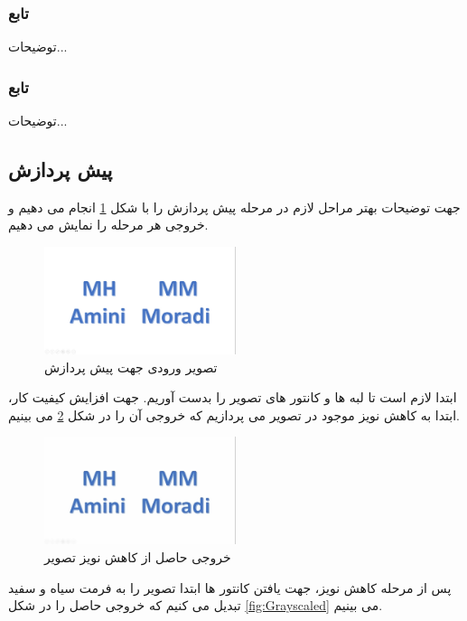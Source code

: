 \documentclass{article}
\begin{document}
{\subsubsection{تابع
}
توضیحات...

\subsubsection{تابع
}
توضیحات...


\subsection{پیش پردازش}
جهت توضیحات بهتر مراحل لازم در مرحله پیش پردازش را با شکل
\ref{fig:Sample6}
انجام می دهیم و خروجی هر مرحله را نمایش می دهیم.\\
\begin{figure}[h!]
 \centering 
 \includegraphics[width=0.5\textwidth]{Sample6.jpg}
 \caption{تصویر ورودی جهت پیش پردازش}
 \label{fig:Sample6}
\end{figure}
ابتدا لازم است تا لبه
 ها و کانتور
 های تصویر را بدست آوریم. جهت افزایش کیفیت کار، ابتدا به کاهش نویز موجود در تصویر می پردازیم که خروجی آن را در شکل
\ref{fig:Denoised}
می بینیم.
\begin{figure}[h!]
 \centering 
 \includegraphics[width=0.5\textwidth]{DenoisedSample6.jpg}
 \caption{خروجی حاصل از کاهش نویز تصویر}
 \label{fig:Denoised}
\end{figure}
  پس از مرحله کاهش نویز، جهت یافتن کانتور ها ابتدا تصویر را به فرمت سیاه و سفید
تبدیل می کنیم که خروجی حاصل را در شکل 
\ref*{fig:Grayscaled}
می بینیم.\\
\begin{figure}[h!]

\end{figure}}
\end{document}
